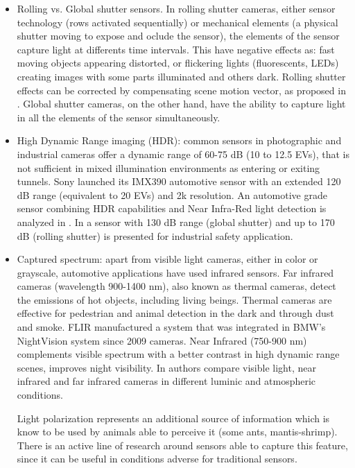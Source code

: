 \begin{itemize}
    \item Rolling vs. Global shutter sensors. In rolling
    shutter cameras, either sensor technology (rows activated sequentially) or
    mechanical elements (a physical shutter moving to expose and oclude the 
    sensor), the elements of the sensor capture light at differents time 
    intervals. This have negative effects as: fast moving objects appearing
    distorted, or flickering lights (fluorescents, LEDs) creating images with 
    some parts illuminated and others dark. Rolling shutter effects
    can be corrected by compensating scene motion vector, as proposed in 
    \cite{Chia-KaiLiang2008}\cite{Chun2008}.
    Global shutter cameras, on the other hand, have the ability to capture 
    light in all the elements of the sensor simultaneously.
    
    \item High Dynamic Range imaging (HDR): common sensors in photographic and 
    industrial cameras offer a dynamic range of 60-75 dB (10 to 12.5 EVs),
    that is not sufficient in mixed illumination environments as entering or 
    exiting tunnels. Sony launched its IMX390 automotive sensor with an
    extended 120 dB range (equivalent to 20 EVs) and 2k resolution. 
    An automotive grade sensor combining HDR capabilities and 
    Near Infra-Red light detection is analyzed in \cite{Maddalena2005}. 
    In \cite{Strobel2013} a sensor with 130 dB range (global shutter) and up
    to 170 dB (rolling shutter) is presented for industrial safety application. 
        
    \item Captured spectrum: apart from visible light cameras, either in color
    or grayscale, automotive applications have used infrared sensors.
    Far infrared cameras (wavelength 900-1400 nm), 
    also known as thermal cameras, detect the emissions of hot objects, 
    including living beings. Thermal cameras are effective for pedestrian and
    animal detection \cite{OMalley2008}\cite{Besbes2015} in the dark and 
    through dust and smoke. FLIR manufactured a system that was integrated
    in BMW's NightVision system since 2009 cameras. Near Infrared (750-900 nm)
    complements visible spectrum with a better contrast in high dynamic range
    scenes, improves night visibility. In \cite{Pinchon2018} authors compare
    visible light, near infrared and far infrared cameras in different 
    luminic and atmospheric conditions.
    
    Light polarization represents an additional source of information which
    is know to be used by animals able to perceive it (some ants, 
    mantis-shrimp). There is an active line of research \cite{Garcia2018}
    around sensors able  to capture this feature, since it can be useful in
    conditions adverse for traditional sensors. 
    
    
\end{itemize} 

